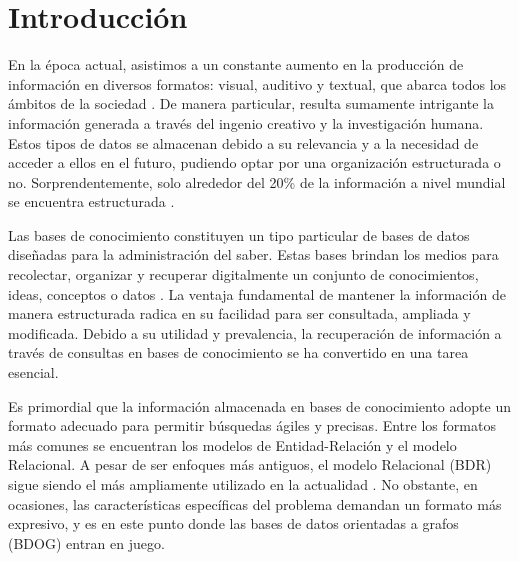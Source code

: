 \chapter*{Introducción}

\qquad 

En la época actual, asistimos a un constante aumento en la producción de información en diversos formatos: visual, auditivo y textual, que abarca todos los ámbitos de la sociedad \cite{datagenworld}. De manera particular, resulta sumamente intrigante la información generada a través del ingenio creativo y la investigación humana. Estos tipos de datos se almacenan debido a su relevancia y a la necesidad de acceder a ellos en el futuro, pudiendo optar por una organización estructurada o no. Sorprendentemente, solo alrededor del 20\% de la información a nivel mundial se encuentra estructurada \cite{structdata}.

Las bases de conocimiento constituyen un tipo particular de bases de datos diseñadas para la administración del saber. Estas bases brindan los medios para recolectar, organizar y recuperar digitalmente un conjunto de conocimientos, ideas, conceptos o datos \cite{orgkb}. La ventaja fundamental de mantener la información de manera estructurada radica en su facilidad para ser consultada, ampliada y modificada. Debido a su utilidad y prevalencia, la recuperación de información a través de consultas en bases de conocimiento se ha convertido en una tarea esencial.

Es primordial que la información almacenada en bases de conocimiento adopte un formato adecuado para permitir búsquedas ágiles y precisas. Entre los formatos más comunes se encuentran los modelos de Entidad-Relación y el modelo Relacional. A pesar de ser enfoques más antiguos, el modelo Relacional (BDR) sigue siendo el más ampliamente utilizado en la actualidad \cite{datamodel}. No obstante, en ocasiones, las características específicas del problema demandan un formato más expresivo, y es en este punto donde las bases de datos orientadas a grafos (BDOG) \cite{graphdbs} entran en juego.

